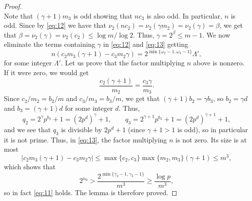 \documentclass[11pt]{article}
\begin{document}
\begin{proof}
\begin{equation}
\end{equation}
Note that $(\gamma+1)m_3$ is odd showing that $nc_3$ is also odd. In particular, $n$ is odd. Since by \eqref{eq:12} we have that $\nu_2(nc_2)=\nu_2(\gamma m_2)=\nu_2(\gamma)=\beta$, we get that 
$\beta=\nu_2(\gamma)=\nu_2(c_2)\le \log m/\log 2$. Thus, $\gamma=2^{\beta}\le m-1$. We now eliminate the terms containing $\gamma$ in \eqref{eq:12} and \eqref{eq:13} getting 
\begin{equation}
\label{eq:14}
n(c_2 m_3(\gamma+1)-c_3m_2\gamma)=2^{\min\{\omega_2-1,\omega_3-1\}}\Lambda',
\end{equation}
for some integer $\Lambda'$. Let us prove that the factor multiplying $n$ above is nonzero. If it were zero, we would get
$$
\frac{c_2(\gamma+1)}{m_2}=\frac{c_3\gamma}{m_3}.
$$
Since $c_2/m_2=b_2/m$ and $c_3/m_3=b_3/m$, we get that $(\gamma+1)b_2=\gamma b_3$, so $b_2=\gamma d$ and $b_3=(\gamma+1)d$ for some integer $d$. Thus, 
$$
q_2=2^{\gamma} p^{b_2}+1=(2p^d)^{\gamma}+1,\qquad q_3=2^{\gamma+1} p^{b_3}+1=(2p^d)^{\gamma+1}+1,
$$
and we see that $q_3$ is divisible by $2p^d+1$ (since $\gamma+1>1$ is odd), so in particular it is not prime. Thus, in \eqref{eq:13}, the factor multiplying $n$ is not zero. Its size is at most
$$
|c_2m_3(\gamma+1)-c_3m_2\gamma|\le \max\{c_2,c_3\}\max\{m_2,m_3\}(\gamma+1)\le m^3,
$$
which shows that 
$$
2^{n_0}> \frac{2^{\min\{\gamma_2-1,\gamma_3-1\}}}{m^3}\ge \frac{\log p}{m^3},
$$
so in fact \eqref{eq:11} holds. The lemma is therefore proved.  
\end{proof}
\end{document}
